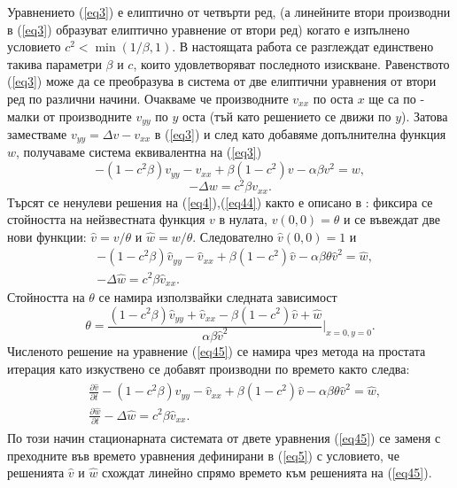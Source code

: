 \documentclass{article}
\newcommand{\rf}[1]{(\ref{#1})}
\begin{document}
Уравнението \rf{eq3} е елиптично от четвърти ред, (а линейните втори производни в \rf{eq3} образуват елиптично уравнение от втори ред) когато е изпълнено условието $c^2 < \min (1/ \beta,1)$. В настоящата работа се разглеждат единствено такива параметри $\beta$ и $c$, които удовлетворяват последното изискване.
Равенството \rf{eq3} може да се преобразува в система от две елиптични уравнения от втори ред по различни начини. Очакваме че производните $v_{xx}$ по оста $x$ ще са по - малки от производните $v_{yy}$ по $y$ оста (тъй като решението се движи по $y$). Затова заместваме $v_{yy} = \Delta v- v_{xx}$ в \rf{eq3} и след като добавяме допълнителна функция $w$, получаваме система еквивалентна на \rf{eq3}
\begin{equation}\label{eq4}
- (1- c^2 \beta) v_{yy} - v_{xx} + \beta (1-c^2) v - \alpha \beta v^2 = w, 
\end{equation}
\begin{equation}\label{eq44}
 - \Delta w = c^2 \beta v_{xx}. 
\end{equation}
Търсят се ненулеви решения на \rf{eq4},\rf{eq44} както е описано в \cite{Ch2012,chd-chr}: фиксира се стойността на нейзвестната функция $v$ в нулата, $v(0,0)=\theta$ и се въвеждат две нови функции: $\widehat{v}=v/{\theta} $ и $\widehat{w}=w/{\theta} $. Следователно $\widehat{v}(0,0)=1$ и 
\begin{equation}\label{eq45}
\begin{split}
 &- (1 - c^2 \beta) \widehat{v}_{yy} -\widehat{v}_{xx} + \beta (1-c^2) \widehat{v} - \alpha \beta \theta \widehat{v}^2 = \widehat{w}, \\
 &- \Delta \widehat{w} =  c^2 \beta \widehat{v}_{xx}.
\end{split}
\end{equation}
Стойността на $\theta$ се намира използвайки следната зависимост
\begin{equation}\label{eqtheta}
\theta = \frac{ (1-c^2 \beta) \widehat{v}_{yy} + \widehat{v}_{xx} - \beta (1-c^2) \widehat{v} +\widehat{w}}{\alpha \beta \widehat{v}^2 } |_{x=0,y=0}.
\end{equation}
Численото решение на уравнение \rf{eq45} се намира чрез метода на простата итерация като изкуствено се добавят производни по времето както следва:
\begin{align}\label{eq5}
\begin{split}
 &\frac {\partial \widehat{v}}{\partial t} - (1 - c^2 \beta) \widehat{v}_{yy} -\widehat{v}_{xx} + \beta (1-c^2) \widehat{v} - \alpha \beta \theta \widehat{v}^2 = \widehat{w}, \\
 &\frac {\partial \widehat{w}}{\partial t} - \Delta \widehat{w} =  c^2 \beta \widehat{v}_{xx}. 
\end{split}
\end{align}
По този начин стационарната системата от двете уравнения \rf{eq45} се заменя с преходните във времето уравнения дефинирани в \rf{eq5} с условието, че решенията $\widehat{v}$ и $\widehat{w}$ схождат линейно спрямо времето към решенията на \rf{eq45}.
 
\end{document}

